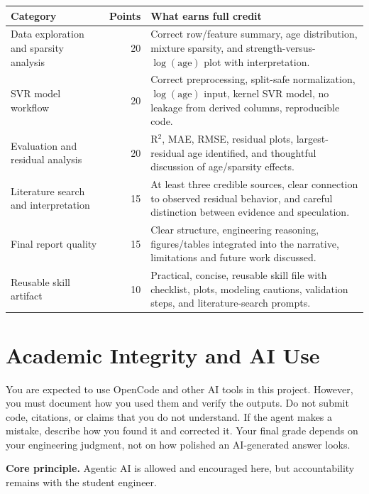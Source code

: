 \documentclass[12pt]{article}
\begin{document}
\begin{center}
\begin{tabularx}{0.95\textwidth}{l r X}
\toprule
\textbf{Category} & \textbf{Points} & \textbf{What earns full credit} \\
\midrule
Data exploration and sparsity analysis & 20 & Correct row/feature summary, age distribution, mixture sparsity, and strength-versus-$\log(\text{age})$ plot with interpretation. \\
SVR model workflow & 20 & Correct preprocessing, split-safe normalization, $\log(\text{age})$ input, kernel SVR model, no leakage from derived columns, reproducible code. \\
Evaluation and residual analysis & 20 & R$^2$, MAE, RMSE, residual plots, largest-residual age identified, and thoughtful discussion of age/sparsity effects. \\
Literature search and interpretation & 15 & At least three credible sources, clear connection to observed residual behavior, and careful distinction between evidence and speculation. \\
Final report quality & 15 & Clear structure, engineering reasoning, figures/tables integrated into the narrative, limitations and future work discussed. \\
Reusable skill artifact & 10 & Practical, concise, reusable skill file with checklist, plots, modeling cautions, validation steps, and literature-search prompts. \\
\bottomrule
\end{tabularx}
\end{center}

\section{Academic Integrity and AI Use}

You are expected to use OpenCode and other AI tools in this project.  However, you must document how you used them and verify the outputs.  Do not submit code, citations, or claims that you do not understand.  If the agent makes a mistake, describe how you found it and corrected it.  Your final grade depends on your engineering judgment, not on how polished an AI-generated answer looks.

\begin{def-box}
\textbf{Core principle.}  Agentic AI is allowed and encouraged here, but accountability remains with the student engineer.
\end{def-box}
\end{document}
